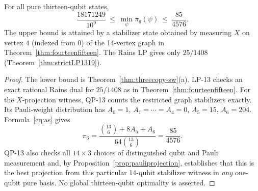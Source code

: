 \begin{proposition}
\label{prop:thirteeninterval}
For all pure thirteen-qubit states,
\[
 \frac{18171249}{10^9}\ \le\
 \min_\psi\pi_6(\psi)\ \le\ \frac{85}{4576}.
\]
The upper bound is attained by a stabilizer state obtained by
measuring $X$ on vertex $4$ (indexed from $0$) of the 14-vertex graph
in Theorem~\ref{thm:fourteenfifteen}. The Rains LP gives only $25/1408$
(Theorem~\ref{thm:strictLP1319}).
\end{proposition}
\begin{proof}
The lower bound is Theorem~\ref{thm:threecopy-sw}(a). LP-13 checks an
exact rational Rains dual for $25/1408$ as in
Theorem~\ref{thm:fourteenfifteen}. For the $X$-projection witness,
QP-13 counts the restricted graph stabilizers exactly. Its
Pauli-weight distribution has $A_0=1$, $A_1=\cdots=A_4=0$,
$A_5=15$, $A_6=204$. Formula~\eqref{eq:as} gives
\[
 \pi_6=\frac{\binom{13}{6}+8A_5+A_6}
                 {64\binom{13}{6}}=\frac{85}{4576}.
\]
QP-13 also checks all $14\times3$ choices of distinguished qubit
and Pauli measurement and, by Proposition~\ref{prop:pauliprojection},
establishes that this is the best projection from this particular
14-qubit stabilizer witness in \emph{any} one-qubit pure basis.
No global thirteen-qubit optimality is asserted.
\end{proof}



